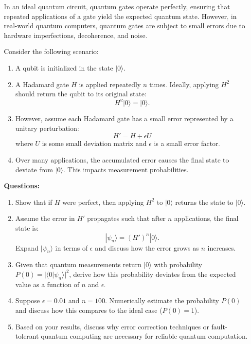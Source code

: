 \documentclass[12pt]{article}
\begin{document}
In an ideal quantum circuit, quantum gates operate perfectly, ensuring that repeated applications of a gate yield the expected quantum state. However, in real-world quantum computers, quantum gates are subject to small errors due to hardware imperfections, decoherence, and noise. 

Consider the following scenario:

\begin{enumerate}
    \item A qubit is initialized in the state \( |0\rangle \).
    \item A Hadamard gate \( H \) is applied repeatedly \( n \) times. Ideally, applying \( H^2 \) should return the qubit to its original state: 
    \[
    H^2 |0\rangle = |0\rangle.
    \]
    \item However, assume each Hadamard gate has a small error represented by a unitary perturbation:
    \[
    H' = H + \epsilon U
    \]
    where \( U \) is some small deviation matrix and \( \epsilon \) is a small error factor.
    \item Over many applications, the accumulated error causes the final state to deviate from \( |0\rangle \). This impacts measurement probabilities.
\end{enumerate}

\textbf{Questions:}

\begin{enumerate}
    \item Show that if \( H \) were perfect, then applying \( H^2 \) to \( |0\rangle \) returns the state to \( |0\rangle \).
    \item Assume the error in \( H' \) propagates such that after \( n \) applications, the final state is:
    \[
    |\psi_n\rangle = (H')^n |0\rangle.
    \]
    Expand \( |\psi_n\rangle \) in terms of \( \epsilon \) and discuss how the error grows as \( n \) increases.
    \item Given that quantum measurements return \( |0\rangle \) with probability \( P(0) = |\langle 0 | \psi_n \rangle|^2 \), derive how this probability deviates from the expected value as a function of \( n \) and \( \epsilon \).
    \item Suppose \( \epsilon = 0.01 \) and \( n = 100 \). Numerically estimate the probability \( P(0) \) and discuss how this compares to the ideal case (\( P(0) = 1 \)).
    \item Based on your results, discuss why error correction techniques or fault-tolerant quantum computing are necessary for reliable quantum computation.
\end{enumerate}
\end{document}
